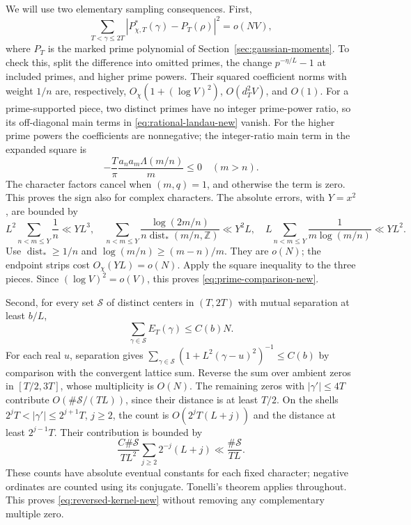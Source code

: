 We will use two elementary sampling consequences. First,
\begin{equation}\label{eq:prime-comparison-new}
 \sum_{T<\gamma\le2T}
    |P^*_{\chi,T}(\gamma)-P_T(\rho)|^2=o(NV),
\end{equation}
where $P_T$ is the marked prime polynomial of
Section~\ref{sec:gaussian-moments}. To check this, split the difference
into omitted primes, the change $p^{-\eta/L}-1$ at included primes,
and higher prime powers. Their squared coefficient norms with weight
$1/n$ are, respectively,
$O_\chi(1+(\log V)^2)$, $O(d_T^2V)$, and $O(1)$.
For a prime-supported piece, two distinct primes have no integer
prime-power ratio, so its off-diagonal main terms in
\eqref{eq:rational-landau-new} vanish. For the higher prime powers
the coefficients are nonnegative; the integer-ratio main term in the
expanded square is
\[
             -\frac T\pi\frac{a_na_m\Lambda(m/n)}m\le0
             \quad(m>n).
\]
The character factors cancel when $(m,q)=1$, and otherwise the
term is zero. This proves the sign also for complex characters.
The absolute errors, with $Y=x^2$, are bounded by
\[
 L^2\sum_{n<m\le Y}\frac1n\ll YL^3,\quad
 \sum_{n<m\le Y}\frac{\log(2m/n)}
                  {n\operatorname{dist}_*(m/n,\mathbb Z)}
                       \ll Y^2L,\quad
 L\sum_{n<m\le Y}\frac1{m\log(m/n)}\ll YL^2.
\]
Use $\operatorname{dist}_*\ge1/n$ and
$\log(m/n)\ge(m-n)/m$. They are $o(N)$; the endpoint strips cost
$O_\chi(YL)=o(N)$. Apply the square inequality to the three pieces.
Since $(\log V)^2=o(V)$, this proves
\eqref{eq:prime-comparison-new}.

Second, for every set $\mathcal S$ of distinct centers in $(T,2T)$
with mutual separation at least $b/L$,
\begin{equation}\label{eq:reversed-kernel-new}
                     \sum_{\gamma\in\mathcal S}E_T(\gamma)
                          \le C(b)N.
\end{equation}
For each real $u$, separation gives
$\sum_{\gamma\in\mathcal S}(1+L^2(\gamma-u)^2)^{-1}\le C(b)$
by comparison with the convergent lattice sum.
Reverse the sum over ambient zeros in $[T/2,3T]$, whose multiplicity
is $O(N)$. The remaining zeros with $|\gamma'|\le4T$ contribute
$O(\#\mathcal S/(TL))$, since their distance is at least $T/2$.
On the shells $2^jT<|\gamma'|\le2^{j+1}T$, $j\ge2$, the count
is $O(2^jT(L+j))$ and the distance at least $2^{j-1}T$.
Their contribution is bounded by
\[
 \frac{C\#\mathcal S}{TL^2}\sum_{j\ge2}2^{-j}(L+j)
                 \ll\frac{\#\mathcal S}{TL}.
\]
These counts have absolute eventual constants for each fixed
character; negative ordinates are counted using its conjugate.
Tonelli's theorem applies throughout. This proves
\eqref{eq:reversed-kernel-new} without removing any complementary
multiple zero.

